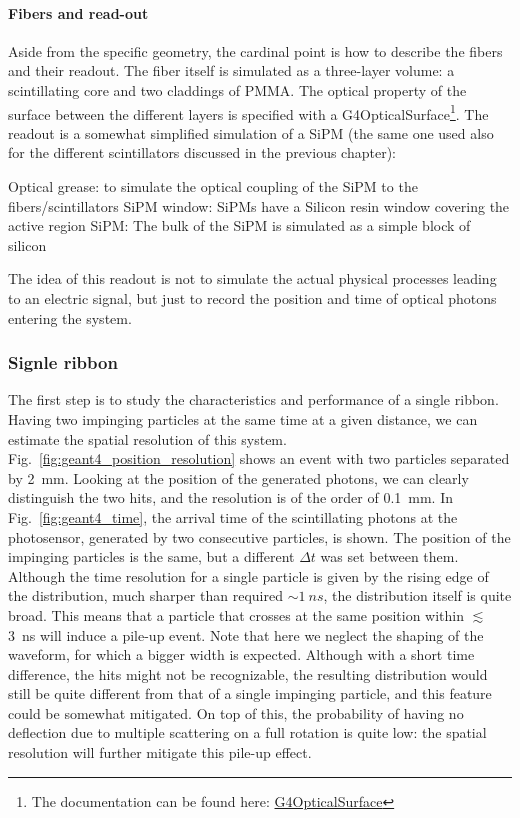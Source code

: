 \begin{refsection}
        \paragraph{Fibers and read-out} Aside from the specific geometry, the cardinal point is how to describe the fibers and their readout. 
        The fiber itself is simulated as a three-layer volume: a scintillating core and two claddings of PMMA.
        The optical property of the surface between the different layers is specified with a G4OpticalSurface\footnote{The documentation can be found here: \href{https://apc.u-paris.fr/~franco/g4doxy/html/classG4OpticalSurface.html}{G4OpticalSurface}}.
        The readout is a somewhat simplified simulation of a SiPM (the same one used also for the different scintillators discussed in the previous chapter):
        \begin{outline}
            \1 Optical grease: to simulate the optical coupling of the SiPM to the fibers/scintillators
            \1 SiPM window: SiPMs have a Silicon resin window covering the active region
            \1 SiPM: The bulk of the SiPM is simulated as a simple block of silicon
        \end{outline}
        The idea of this readout is not to simulate the actual physical processes leading to an electric signal, but just to record the position and time of optical photons entering the system.

        \subsubsection{Signle ribbon}
        The first step is to study the characteristics and performance of a single ribbon. Having two impinging particles at the same time at a given distance, we can estimate the spatial resolution of this system.  Fig.~\ref{fig:geant4_position_resolution} shows an event with two particles separated by \SI{2}{mm}. Looking at the position of the generated photons, we can clearly distinguish the two hits, and the resolution is of the order of \SI{0.1}{mm}.
        In Fig.~\ref{fig:geant4_time}, the arrival time of the scintillating photons at the photosensor, generated by two consecutive particles, is shown. 
        The position of the impinging particles is the same, but a different $\Delta t$ was set between them. 
        Although the time resolution for a single particle is given by the rising edge of the distribution, much sharper than required $\sim \SI{1}{ns}$, the distribution itself is quite broad. 
        This means that a particle that crosses at the same position within $\lesssim$ \SI{3}{ns} will induce a pile-up event. 
        Note that here we neglect the shaping of the waveform, for which a bigger width is expected. 
        Although with a short time difference, the hits might not be recognizable, the resulting distribution would still be quite different from that of a single impinging particle, and this feature could be somewhat mitigated. 
        On top of this, the probability of having no deflection due to multiple scattering on a full rotation is quite low: the spatial resolution will further mitigate this pile-up effect. 
        

\end{refsection}
